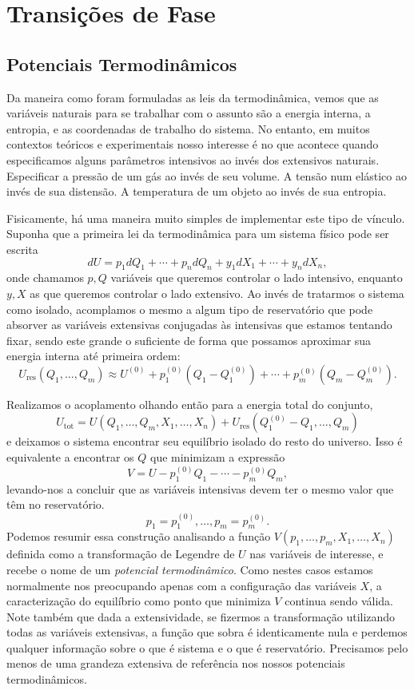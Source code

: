 \section{Transições de Fase}

\subsection{Potenciais Termodinâmicos}

Da maneira como foram formuladas as leis da termodinâmica, vemos que as
variáveis naturais para se trabalhar com o assunto são a energia interna, a
entropia, e as coordenadas de trabalho do sistema. No entanto, em muitos
contextos teóricos e experimentais nosso interesse é no que acontece quando
especificamos alguns parâmetros intensivos ao invés dos extensivos naturais.
Especificar a pressão de um gás ao invés de seu volume. A tensão num elástico ao
invés de sua distensão. A temperatura de um objeto ao invés de sua entropia. 

Fisicamente, há uma maneira muito simples de implementar este tipo de vínculo.
Suponha que a primeira lei da termodinâmica para um sistema físico pode ser
escrita
$$dU=p_1dQ_1+\cdots+p_ndQ_n+y_1dX_1+\cdots+y_ndX_n,$$
onde chamamos $p,Q$ variáveis que queremos controlar o lado intensivo, enquanto
$y,X$ as que queremos controlar o lado extensivo. Ao invés de tratarmos o
sistema como isolado, acomplamos o mesmo a algum tipo de reservatório que pode
absorver as variáveis extensivas conjugadas às intensivas que estamos tentando
fixar, sendo este grande o suficiente de forma que possamos aproximar sua
energia interna até primeira ordem:
$$U_\text{res}(Q_1,\dots,Q_m)
\approx U^{(0)}+p^{(0)}_1(Q_1-Q^{(0)}_1)+\cdots+p^{(0)}_m(Q_m-Q^{(0)}_m).$$

Realizamos o acoplamento olhando então para a energia total do conjunto,
$$U_\text{tot}=U(Q_1,\dots,Q_m,X_1,\dots,X_n)
+U_\text{res}(Q^{(0)}_1-Q_1,\dots,Q_m)$$
e deixamos o sistema encontrar seu equilíbrio isolado do resto do universo. Isso
é equivalente a encontrar os $Q$ que minimizam a expressão
$$V=U-p^{(0)}_1Q_1-\cdots-p^{(0)}_mQ_m,$$
levando-nos a concluir que as variáveis intensivas devem ter o mesmo valor que
têm no reservatório.
$$p_1=p^{(0)}_1,\dots,p_m=p^{(0)}_m.$$
Podemos resumir essa construção analisando a função $V(p_1,\dots,p_m,X_1,\dots,
X_n)$ definida como a transformação de Legendre de $U$ nas variáveis de
interesse, e recebe o nome de um \emph{potencial termodinâmico}. Como nestes
casos estamos normalmente nos preocupando apenas com a configuração das
variáveis $X$, a caracterização do equilíbrio como ponto que minimiza $V$
continua sendo válida. Note também que dada a extensividade, se fizermos a
transformação utilizando todas as variáveis extensivas, a função que sobra é
identicamente nula e perdemos qualquer informação sobre o que é sistema e o que
é reservatório. Precisamos pelo menos de uma grandeza extensiva de referência
nos nossos potenciais termodinâmicos. 

